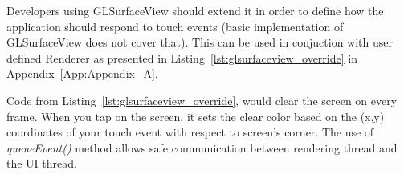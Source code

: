 %

Developers using GLSurfaceView should extend it in order to define how the application should respond to touch events (basic implementation of GLSurfaceView does not cover that). 
This can be used in conjuction with user defined Renderer as presented in Listing~\ref{lst:glsurfaceview_override} in Appendix~\ref{App:Appendix_A}. 

%

Code from Listing~\ref{lst:glsurfaceview_override}, would clear the screen on every frame.
When you tap on the screen, it sets the clear color based on the (x,y) coordinates of your touch event with respect to screen's corner.
The use of \emph{queueEvent()} method allows safe communication between rendering thread and the UI thread.